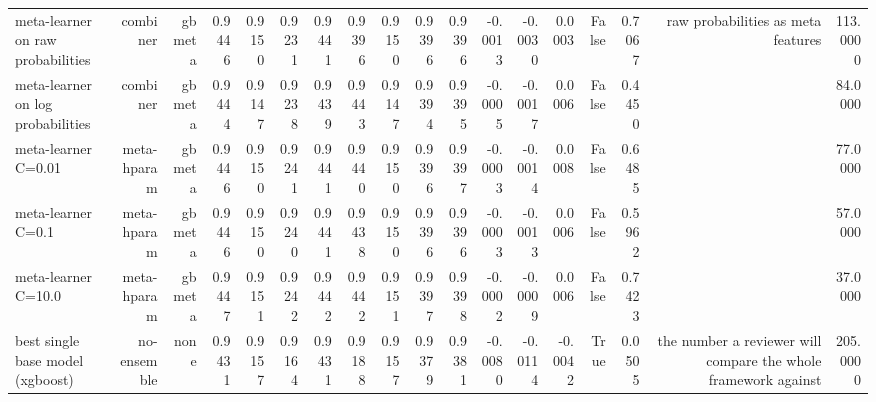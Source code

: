 \begin{table}[t]
{\begin{tabular}{lrrrrrrrrrrrrrrrrr}
meta-learner on raw probabilities & combiner & gbmeta & 0.9446 & 0.9150 & 0.9231 & 0.9441 & 0.9396 & 0.9150 & 0.9396 & 0.9396 & -0.0013 & -0.0030 & 0.0003 & False & 0.7067 & raw probabilities as meta features & 113.0000 \\
meta-learner on log probabilities & combiner & gbmeta & 0.9444 & 0.9147 & 0.9238 & 0.9439 & 0.9443 & 0.9147 & 0.9394 & 0.9395 & -0.0005 & -0.0017 & 0.0006 & False & 0.4450 &  & 84.0000 \\
meta-learner C=0.01 & meta-hparam & gbmeta & 0.9446 & 0.9150 & 0.9241 & 0.9441 & 0.9440 & 0.9150 & 0.9396 & 0.9397 & -0.0003 & -0.0014 & 0.0008 & False & 0.6485 &  & 77.0000 \\
meta-learner C=0.1 & meta-hparam & gbmeta & 0.9446 & 0.9150 & 0.9240 & 0.9441 & 0.9438 & 0.9150 & 0.9396 & 0.9396 & -0.0003 & -0.0013 & 0.0006 & False & 0.5962 &  & 57.0000 \\
meta-learner C=10.0 & meta-hparam & gbmeta & 0.9447 & 0.9151 & 0.9242 & 0.9442 & 0.9442 & 0.9151 & 0.9397 & 0.9398 & -0.0002 & -0.0009 & 0.0006 & False & 0.7423 &  & 37.0000 \\
best single base model (xgboost) & no-ensemble & none & 0.9431 & 0.9157 & 0.9164 & 0.9431 & 0.9188 & 0.9157 & 0.9379 & 0.9381 & -0.0080 & -0.0114 & -0.0042 & True & 0.0505 & the number a reviewer will compare the whole framework against & 205.0000 \\
\bottomrule
\end{tabular}
}
\end{table}

